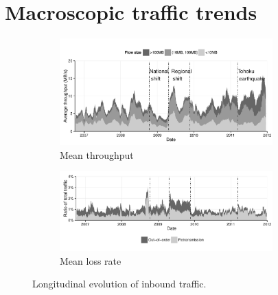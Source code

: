 \section{Macroscopic traffic trends}
\label{section:malawi:macro}

\begin{figure}
  \centering
  \begin{subfigure}[b]{1.0\linewidth}
  \includegraphics[width=0.9\textwidth]{figures/malawi/tput}
  \caption{Mean throughput}
  \end{subfigure}
  \begin{subfigure}[b]{1.0\linewidth}
  \includegraphics[width=0.9\textwidth]{figures/malawi/losses}
  \caption{Mean loss rate}
  \end{subfigure}
  \caption{Longitudinal evolution of inbound traffic.}\label{fig:MAWI}
\end{figure}

